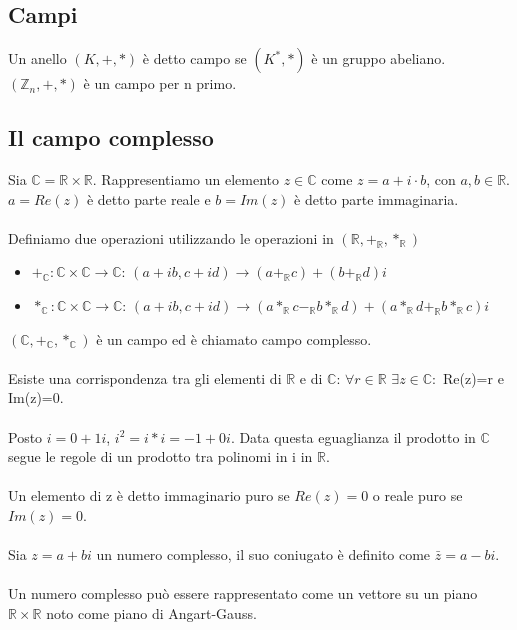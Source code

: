 \documentclass{article}
\begin{document}
\subsection{Campi}
Un anello $(K,+,*)$ è detto campo se $(K^*,*)$ è un gruppo abeliano.\\
$(\mathds{Z}_n,+,*)$ è un campo per n primo.

\subsection{Il campo complesso}
Sia $\mathds{C}=\mathds{R}\times\mathds{R}$. Rappresentiamo un elemento $z\in\mathds{C}$ come $z=a+i\cdot b$, con $a,b\in\mathds{R}$.\\
$a=Re(z)$ è detto parte reale e $b=Im(z)$ è detto parte immaginaria.\\\\
Definiamo due operazioni utilizzando le operazioni in $(\mathds{R},+_\mathds{R},*_\mathds{R})$
\begin{itemize}
    \item $+_\mathds{C}:\mathds{C}\times\mathds{C}\rightarrow\mathds{C}$: $(a+ib,c+id)\rightarrow(a+_\mathds{R}c)+(b+_\mathds{R}d)i$
    \item $*_\mathds{C}:\mathds{C}\times\mathds{C}\rightarrow\mathds{C}$: $(a+ib,c+id)\rightarrow(a*_\mathds{R}c-_\mathds{R}b*_\mathds{R}d)+(a*_\mathds{R}d+_\mathds{R}b*_\mathds{R}c)i$
\end{itemize}
$(\mathds{C},+_\mathds{C},*_\mathds{C})$ è un campo ed è chiamato campo complesso.\\\\
Esiste una corrispondenza tra gli elementi di $\mathds{R}$ e di $\mathds{C}$: $\forall r\in\mathds{R}$ $\exists z\in\mathds{C}:$ Re(z)=r e Im(z)=0.\\\\
Posto $i=0+1i$, $i^2=i*i=-1+0i$. Data questa eguaglianza il prodotto in $\mathds{C}$ segue le regole di un prodotto tra polinomi in i in $\mathds{R}$.\\\\
Un elemento di z è detto immaginario puro se $Re(z)=0$ o reale puro se $Im(z)=0$.\\\\
Sia $z=a+bi$ un numero complesso, il suo coniugato è definito come $\bar{z}=a-bi$.\\\\
Un numero complesso può essere rappresentato come un vettore su un piano $\mathds{R}\times\mathds{R}$ noto come piano di Angart-Gauss.
\end{document}
